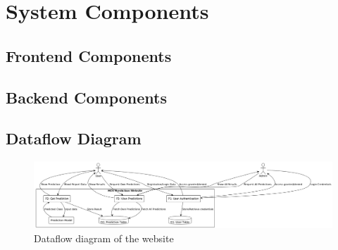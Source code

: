 \section{System Components}
\subsection{Frontend Components}
\subsection{Backend Components}
\subsection{Dataflow Diagram}
\begin{figure}[htbp]
  \begin{center}
    \includegraphics[width=\textwidth]{figures/dataflow.png}
  \end{center}
  \caption{Dataflow diagram of the website}\label{fig:dataflow}
\end{figure}

